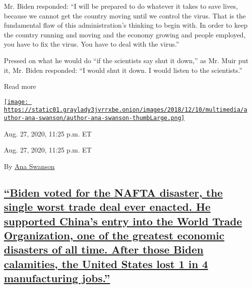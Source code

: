 Mr. Biden responded: ``I will be prepared to do whatever it takes to
save lives, because we cannot get the country moving until we control
the virus. That is the fundamental flaw of this administration's
thinking to begin with. In order to keep the country running and moving
and the economy growing and people employed, you have to fix the virus.
You have to deal with the virus.''

Pressed on what he would do ``if the scientists say shut it down,'' as
Mr. Muir put it, Mr. Biden responded: ``I would shut it down. I would
listen to the scientists.''

Read more

\href{https://www.nytimes3xbfgragh.onion/by/ana-swanson}{\texttt{[image: https://static01.graylady3jvrrxbe.onion/images/2018/12/10/multimedia/author-ana-swanson/author-ana-swanson-thumbLarge.png]}}

Aug. 27, 2020, 11:25 p.m. ET

Aug. 27, 2020, 11:25 p.m. ET

By \href{https://www.nytimes3xbfgragh.onion/by/ana-swanson}{Ana Swanson}

\hypertarget{biden-voted-for-the-nafta-disaster-the-single-worst-trade-deal-ever-enacted-he-supported-chinas-entry-into-the-world-trade-organization-one-of-the-greatest-economic-disasters-of-all-time-after-those-biden-calamities-the-united-states-lost-1-in-4-manufacturing-jobs}{%
\subsection{\texorpdfstring{\protect\hyperlink{biden-voted-for-the-nafta-disaster-the-single-worst-trade-deal-ever-enacted-he-supported-chinas-entry-into-the-world-trade-organ}{``Biden
voted for the NAFTA disaster, the single worst trade deal ever enacted.
He supported China's entry into the World Trade Organization, one of the
greatest economic disasters of all time. After those Biden calamities,
the United States lost 1 in 4 manufacturing
jobs.''}}{``Biden voted for the NAFTA disaster, the single worst trade deal ever enacted. He supported China's entry into the World Trade Organization, one of the greatest economic disasters of all time. After those Biden calamities, the United States lost 1 in 4 manufacturing jobs.''}}\label{biden-voted-for-the-nafta-disaster-the-single-worst-trade-deal-ever-enacted-he-supported-chinas-entry-into-the-world-trade-organization-one-of-the-greatest-economic-disasters-of-all-time-after-those-biden-calamities-the-united-states-lost-1-in-4-manufacturing-jobs}}

